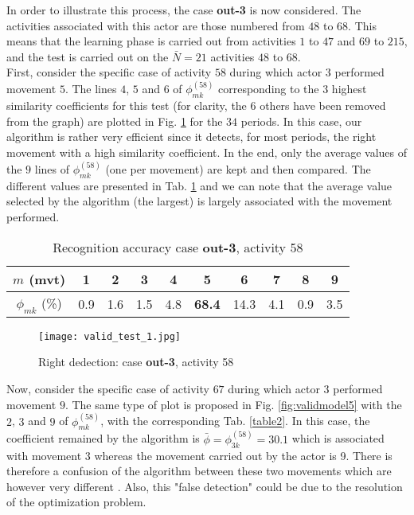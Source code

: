 \documentclass[letterpaper, 10 pt, conference]{ieeeconf}  %
\begin{document}
In order to illustrate this process, the case \textbf{out-3} is now considered. The activities associated with this actor are those numbered from $48$ to $68$. This means that the learning phase is carried out from activities $1$ to $47$ and $69$ to $215$, and the test is carried out on the $\bar{N}=21$ activities $48$ to $68$.\\
First, consider the specific case of activity $58$ during which actor $3$ performed movement $5$. The lines $4$, $5$ and $6$ of $\phi_{mk}^{(58)}$ corresponding to the 3 highest similarity coefficients for this test (for clarity, the 6 others have been removed from the graph) are plotted in Fig. \ref{fig:validmodel4} for the $34$ periods. In this case, our algorithm is rather very efficient since it detects, for most periods, the right movement with a high similarity coefficient. In the end, only the average values of the $9$ lines of $\phi_{mk}^{(58)}$ (one per movement) are kept and then compared. The different values are presented in Tab. \ref{table1} and we can note that the average value selected by the algorithm (the largest) is largely associated with the movement performed.

\begin{table}[h]
\caption{Recognition accuracy case \textbf{out-3}, activity 58}
\label{table1}
\begin{center}
\begin{tabular}{|c||c|c|c|c|c|c|c|c|c|}
\hline
$m$ (mvt) & 1 & 2 & 3 & 4 & \textbf{5} & 6 & 7 & 8 & 9\\
\hline
$\phi_{mk}$ (\%) & 0.9 &    1.6 &  1.5 &  4.8 &    \textbf{68.4} &     14.3 &    4.1 &     0.9 &   3.5\\
\hline
\end{tabular}
\end{center}
\end{table}

\begin{figure}[h]
	
		\hspace{-0.3cm}\texttt{[image: valid\_test\_1.jpg]}
		\caption{Right dedection: case \textbf{out-3}, activity 58} 
		\label{fig:validmodel4}
	
\end{figure}

Now, consider the specific case of activity $67$ during which actor $3$ performed movement $9$. The same type of plot is proposed in Fig. \ref{fig:validmodel5} with the $2$, $3$ and $9$ of $\phi_{mk}^{(58)}$, with the corresponding Tab. \ref{table2}. In this case, the coefficient remained by the algorithm is $\bar{\phi}=\phi_{3k}^{(58)}=30.1$ which is associated with movement 3 whereas the movement carried out by the actor is 9. There is therefore a confusion of the algorithm between these two movements which are however very different . Also, this "false detection" could be due to the resolution of the optimization problem.
\end{document}
